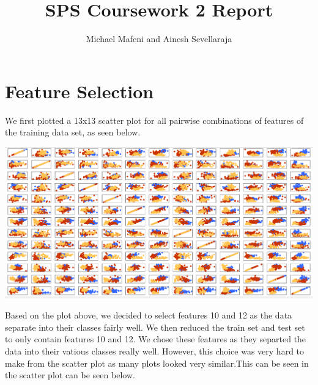 \documentclass[11pt]{article}
\begin{document}
\title{SPS Coursework 2 Report}
\author{Michael Mafeni and Ainesh Sevellaraja}
\date{}
\maketitle

\section{Feature Selection}
We first plotted a 13x13 scatter plot for all pairwise combinations of features of the training data set, as seen below.


\begin{center}
\includegraphics[scale=0.25]{feature_selection}
\end{center}

Based on the plot above, we decided to select features 10 and 12 as the data separate into their classes fairly well. We then reduced the train set and test set to only contain features 10 and 12. We chose these features as they separted the data into their vatious classes really well. However, this choice was very hard to make from the scatter plot as many plots looked very similar.This can be seen in the scatter plot can be seen below.
\end{document}
